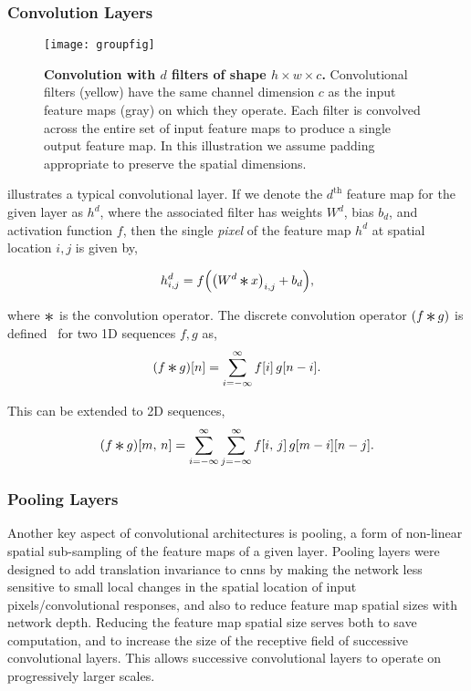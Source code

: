 \documentclass[thesis]{subfiles}
\begin{document}
\subsubsection{Convolution Layers}
\begin{figure}[tb]
	\centering
	\texttt{[image: groupfig]}
	\caption[Illustration of convolutional layer]{\textbf{Convolution with $d$ filters of shape $h\times w\times c$.} Convolutional filters (yellow) have the same channel dimension $c$ as the input feature maps (gray) on which they operate. Each filter is convolved across the entire set of input feature maps to produce a single output feature map. In this illustration we assume padding appropriate to preserve the spatial dimensions.}\label{fig:convlayer}
\end{figure}

 illustrates a typical convolutional layer. If we denote the $d^{\text{th}}$ feature map for the given layer as $h^d$, where the associated filter has weights $W^d$, bias $b_d$, and activation function $f$, then the single \emph{pixel} of the feature map $h^d$ at spatial location $i, j$ is given by,

\begin{equation}
	h^d_{i,j} = f{\left( {\left(W^d \convolution x \right)}_{i,j} + b_d \right)},
\end{equation}

where $\convolution$ is the convolution operator. The discrete convolution operator $(f \convolution g)$ is defined~\citep{damelin2011} for two 1D sequences $f, g$ as,
\begin{equation}
	(f \convolution g)[n] = \sum_{i=-\infty}^\infty f[i]\, g[n - i].
\end{equation}

This can be extended to 2D sequences,
\begin{equation}
(f \convolution g)[m,\,n] = \sum_{i=-\infty}^\infty \sum_{j=-\infty}^\infty f[i,\,j]\, g[m - i][n - j].
\end{equation}

\subsubsection{Pooling Layers}
Another key aspect of convolutional architectures is pooling, a form of non-linear spatial sub-sampling of the feature maps of a given layer. Pooling layers were designed to add translation invariance to \glspl{cnn} by making the network less sensitive to small local changes in the spatial location of input pixels/convolutional responses, and also to reduce feature map spatial sizes with network depth. Reducing the feature map spatial size serves both to save computation, and to increase the size of the receptive field of successive convolutional layers. This allows successive convolutional layers to operate on progressively larger scales.
\end{document}
